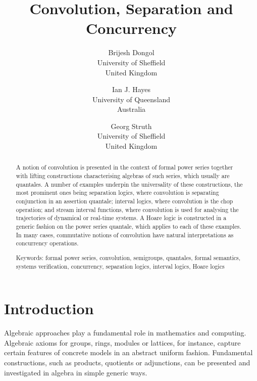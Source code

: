 \documentclass[12pt]{article}
\theoremstyle{definition}
\begin{document}
\title{Convolution, Separation and Concurrency}

\author{Brijesh Dongol\\University of Sheffield\\United Kingdom \and
  Ian J. Hayes\\University of Queensland\\Australia \and Georg
  Struth\\University of Sheffield\\United Kingdom}

\renewcommand{\labelenumi}{(\alph{enumi})}

\maketitle

\begin{abstract}
  A notion of convolution is presented in the context of formal power
  series together with lifting constructions characterising algebras
  of such series, which usually are quantales. A number of examples
  underpin the universality of these constructions, the most prominent
  ones being separation logics, where convolution is separating
  conjunction in an assertion quantale; interval logics, where
  convolution is the chop operation; and stream interval functions,
  where convolution is used for analysing the trajectories of
  dynamical or real-time systems. A Hoare logic is constructed in a
  generic fashion on the power series quantale, which applies to each
  of these examples. In many cases, commutative notions of convolution
  have natural interpretations as concurrency operations.

\vspace{\baselineskip} 

\noindent Keywords: formal power series, convolution, semigroups,
quantales, formal semantics, systems verification, concurrency,
separation logics, interval logics, Hoare logics
  \end{abstract}

  \pagestyle{plain}



\section{Introduction}\label{sec:introduction}

Algebraic approaches play a fundamental role in mathematics and
computing.  Algebraic axioms for groups, rings, modules or lattices,
for instance, capture certain features of concrete models in an
abstract uniform fashion. Fundamental constructions, such as products,
quotients or adjunctions, can be presented and investigated in algebra
in simple generic ways.
\end{document}
